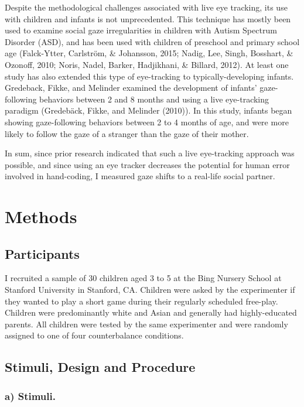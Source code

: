 \documentclass[floatsintext,man]{apa6}
\theoremstyle{definition}
\theoremstyle{definition}
\theoremstyle{definition}
\theoremstyle{remark}
\begin{document}
Despite the methodological challenges associated with live eye tracking,
its use with children and infants is not unprecedented. This technique
has mostly been used to examine social gaze irregularities in children
with Autism Spectrum Disorder (ASD), and has been used with children of
preschool and primary school age (Falck-Ytter, Carlström, \& Johansson,
2015; Nadig, Lee, Singh, Bosshart, \& Ozonoff, 2010; Noris, Nadel,
Barker, Hadjikhani, \& Billard, 2012). At least one study has also
extended this type of eye-tracking to typically-developing infants.
Gredeback, Fikke, and Melinder examined the development of infants'
gaze-following behaviors between 2 and 8 months and using a live
eye-tracking paradigm (Gredebäck, Fikke, and Melinder (2010)). In this
study, infants began showing gaze-following behaviors between 2 to 4
months of age, and were more likely to follow the gaze of a stranger
than the gaze of their mother.

In sum, since prior research indicated that such a live eye-tracking
approach was possible, and since using an eye tracker decreases the
potential for human error involved in hand-coding, I measured gaze
shifts to a real-life social partner.

\section{Methods}\label{methods}

\subsection{Participants}\label{participants}

I recruited a sample of 30 children aged 3 to 5 at the Bing Nursery
School at Stanford University in Stanford, CA. Children were asked by
the experimenter if they wanted to play a short game during their
regularly scheduled free-play. Children were predominantly white and
Asian and generally had highly-educated parents. All children were
tested by the same experimenter and were randomly assigned to one of
four counterbalance conditions.

\subsection{Stimuli, Design and
Procedure}\label{stimuli-design-and-procedure}

\subsubsection{a) Stimuli.}\label{a-stimuli.}
\end{document}
